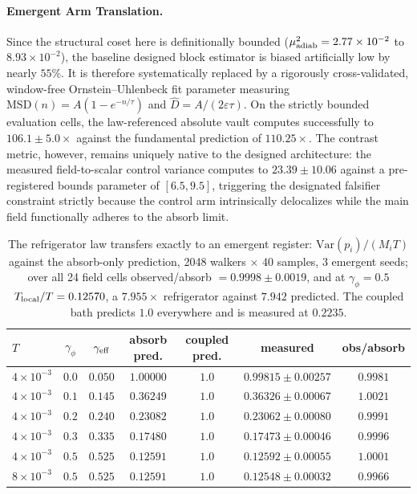 \documentclass{article}
\begin{document}
\paragraph{Emergent Arm Translation.} Since the structural coset here is definitionally bounded ($\mu^2_{\rm adiab}=2.77\times10^{-2}$ to $8.93\times10^{-2}$), the baseline designed block estimator is biased artificially low by nearly $55\%$. It is therefore systematically replaced by a rigorously cross-validated, window-free Ornstein--Uhlenbeck fit parameter measuring $\mathrm{MSD}(n)=A(1-e^{-n/\tau})$ and $\hat D=A/(2\varepsilon\tau)$. On the strictly bounded evaluation cells, the law-referenced absolute vault computes successfully to $106.1\pm5.0\times$ against the fundamental prediction of $110.25\times$. The contrast metric, however, remains uniquely native to the designed architecture: the measured field-to-scalar control variance computes to $23.39\pm10.06$ against a pre-registered bounds parameter of $[6.5,9.5]$, triggering the designated falsifier constraint strictly because the control arm intrinsically delocalizes while the main field functionally adheres to the absorb limit.

\begin{table}[!htb]\centering
\caption{The refrigerator law transfers exactly to an emergent register: $\mathrm{Var}(p_i)/(M_iT)$ against the absorb-only prediction, 2048 walkers $\times$ 40 samples, 3 emergent seeds; over all 24 field cells observed/absorb $=0.9998\pm0.0019$, and at $\gamma_\phi=0.5$ $T_{\rm local}/T=0.12570$, a $7.955\times$ refrigerator against $7.942$ predicted. The coupled bath predicts $1.0$ everywhere and is measured at $0.2235$.}
\begin{tabular}{lcccccc}
\toprule
$T$ & $\gamma_\phi$ & $\gamma_{\rm eff}$ & absorb pred. & coupled pred. & measured & obs/absorb\\
\midrule
$4\times10^{-3}$ & $0.0$ & $0.050$ & $1.00000$ & $1.0$ & $0.99815\pm0.00257$ & $0.9981$\\
$4\times10^{-3}$ & $0.1$ & $0.145$ & $0.36249$ & $1.0$ & $0.36326\pm0.00067$ & $1.0021$\\
$4\times10^{-3}$ & $0.2$ & $0.240$ & $0.23082$ & $1.0$ & $0.23062\pm0.00080$ & $0.9991$\\
$4\times10^{-3}$ & $0.3$ & $0.335$ & $0.17480$ & $1.0$ & $0.17473\pm0.00046$ & $0.9996$\\
$4\times10^{-3}$ & $0.5$ & $0.525$ & $0.12591$ & $1.0$ & $0.12592\pm0.00055$ & $1.0001$\\
$8\times10^{-3}$ & $0.5$ & $0.525$ & $0.12591$ & $1.0$ & $0.12548\pm0.00032$ & $0.9966$\\
\bottomrule
\end{tabular}
\end{table}
\end{document}
